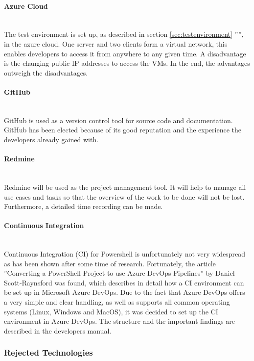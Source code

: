 \paragraph{Azure Cloud}\ \\
The test environment is set up, as described in section \ref{sec:testenvironment} '''', in the azure cloud. One server and two clients form a virtual network, this enables developers to access it from anywhere to any given time. A disadvantage is the changing public IP-addresses to access the VMs. In the end, the advantages outweigh the disadvantages.

\paragraph{GitHub}\ \\
GitHub is used as a version control tool for source code and documentation. GitHub has been elected because of its good reputation and the experience the developers already gained with.

\paragraph{Redmine}\ \\
Redmine will be used as the project management tool. It will help to manage all use cases and tasks so that the overview of the work to be done will not be lost. Furthermore, a detailed time recording can be made.

\clearpage

\paragraph{Continuous Integration}\ \\
Continuous Integration (CI) for Powershell is unfortunately not very widespread as has been shown after some time of research. Fortunately, the article ''Converting a PowerShell Project to use Azure DevOps Pipelines'' \cite{CI} by Daniel Scott-Raynsford was found, which describes in detail how a CI environment can be set up in Microsoft Azure DevOps. Due to the fact that Azure DevOps offers a very simple and clear handling, as well as supports all common operating systems (Linux, Windows and MacOS), it was decided to set up the CI environment in Azure DevOps. The structure and the important findings are described in the developers manual.

\subsubsection{Rejected Technologies}

